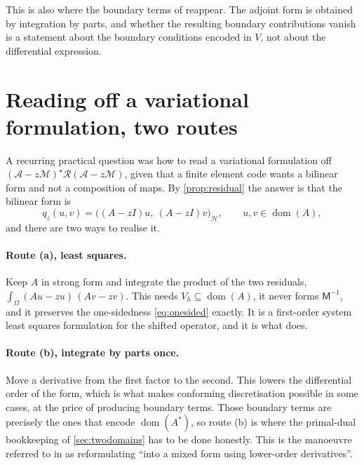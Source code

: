 \documentclass[11pt,a4paper]{article}
\theoremstyle{plain}
\newcommand{\Hb}{\mathcal{H}}
\newcommand{\Vb}{V}
\newcommand{\Aop}{\mathcal{A}}
\DeclareMathOperator{\dom}{dom}
\newcommand{\adj}{\star}                 %
\newcommand{\Riesz}{\mathcal{R}}         %
\newcommand{\Mass}{\mathcal{M}}          %
\begin{document}
This is also where the boundary terms of
\cite[Equations~(3.5)--(3.6)]{LazzarinoNakatsukasaZerbinati2026} reappear.  The
adjoint form is obtained by integration by parts, and whether the resulting
boundary contributions vanish is a statement about the boundary conditions
encoded in $\Vb$, not about the differential expression.

\section{Reading off a variational formulation, two routes}
\label{sec:tworoutes}

A recurring practical question was how to read a variational formulation off
$(\Aop - z\Mass)^{\adj}\Riesz(\Aop - z\Mass)$, given that a finite element code
wants a bilinear form and not a composition of maps.  By
\cref{prop:residual} the answer is that the bilinear form is
\begin{equation}
  \label{eq:qz}
  q_z(u,v) = \bigl((A - zI)u,\ (A - zI)v\bigr)_{\Hb},
  \qquad u,v \in \dom(A),
\end{equation}
and there are two ways to realise it.

\paragraph{Route (a), least squares.}  Keep $A$ in strong form and integrate the
product of the two residuals, $\int_\Omega (Au - zu)\,\overline{(Av - zv)}$.
This needs $V_h \subseteq \dom(A)$, it never forms $\mathsf{M}^{-1}$, and it
preserves the one-sidedness \cref{eq:onesided} exactly.  It is a first-order
system least squares formulation \cite{CaiLazarovManteuffelMcCormick1994} for
the shifted operator, and it is what \cite[Algorithm~3.4]{Colbrook2026} does.

\paragraph{Route (b), integrate by parts once.}  Move a derivative from the
first factor to the second.  This lowers the differential order of the form,
which is what makes conforming discretisation possible in some cases, at the
price of producing boundary terms.  Those boundary terms are precisely the ones
that encode $\dom(A^*)$, so route (b) is where the primal-dual bookkeeping of
\cref{sec:twodomains} has to be done honestly.  This is the manoeuvre referred
to in \cite[p.~129]{Colbrook2026} as reformulating ``into a mixed form using
lower-order derivatives''.
\end{document}
